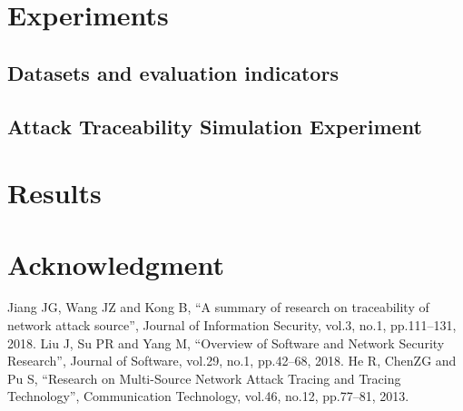 \documentclass[conference]{IEEEtran}
\begin{document}
\section{Experiments}

\subsection{Datasets and evaluation indicators}

\subsection{Attack Traceability Simulation Experiment}

\section{Results}



\section*{Acknowledgment}


\begin{thebibliography}{3}
 Jiang JG, Wang JZ and Kong B, ``A summary of research on traceability of network attack source'', Journal of Information Security, vol.3, no.1, pp.111--131, 2018.
 Liu J, Su PR and Yang M, ``Overview of Software and Network Security Research'', Journal of Software, vol.29, no.1, pp.42--68, 2018.
 He R, ChenZG and Pu S, ``Research on Multi-Source Network Attack Tracing and Tracing Technology'', Communication Technology, vol.46, no.12, pp.77--81, 2013.

\end{thebibliography}
\end{document}
